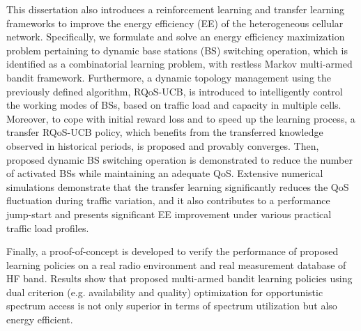 This dissertation also introduces a reinforcement learning and transfer learning frameworks to improve the energy efficiency (EE) of the heterogeneous cellular network. Specifically, we formulate and solve an energy efficiency maximization problem pertaining to dynamic base stations (BS) switching operation, which is identified as a combinatorial learning problem, with restless Markov multi-armed bandit framework. Furthermore, a dynamic topology management using the previously defined algorithm, RQoS-UCB, is introduced to intelligently control the working modes of BSs, based on traffic load and capacity in multiple cells. Moreover, to cope with initial reward loss and to speed up the learning process, a transfer RQoS-UCB policy, which benefits from the transferred knowledge observed in historical periods, is proposed and provably converges. Then, proposed dynamic BS switching operation is demonstrated to reduce the number of activated BSs while maintaining an adequate QoS. Extensive numerical simulations demonstrate that the transfer learning significantly reduces the QoS fluctuation during traffic variation, and it also contributes to a performance jump-start and presents significant EE improvement under various practical traffic load profiles.

 
Finally, a proof-of-concept is developed to verify the performance of proposed learning policies on a real radio environment and real measurement database of HF band. Results show that proposed multi-armed bandit learning policies using dual criterion (e.g. availability and quality) optimization for opportunistic spectrum access is not only superior in terms of spectrum utilization but also energy efficient.




